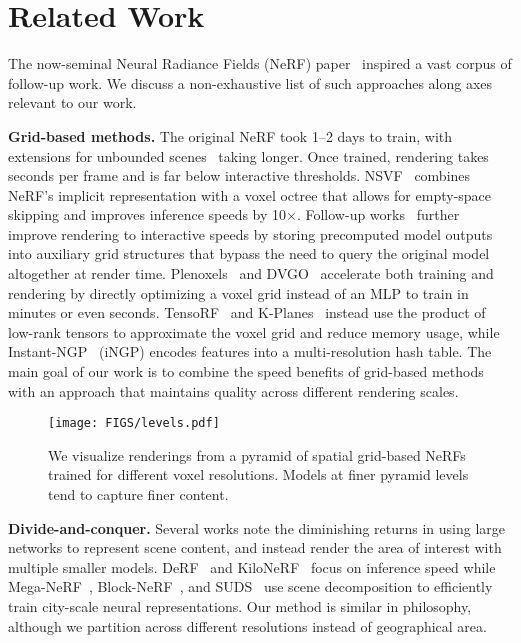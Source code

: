 \documentclass{article}
\begin{document}
\section{Related Work}

The now-seminal Neural Radiance Fields (NeRF) paper~\cite{mildenhall2020nerf} inspired a vast corpus of follow-up work. We discuss a non-exhaustive list of such approaches along axes relevant to our work.

\textbf{Grid-based methods.} The original NeRF took 1--2 days to train, with extensions for unbounded scenes~\cite{zhang2020npp, barron2022mipnerf360} taking longer. Once trained, rendering takes seconds per frame and is far below interactive thresholds. NSVF~\cite{liu2020neural} combines NeRF's implicit representation with a voxel octree that allows for empty-space skipping and improves inference speeds by 10×. Follow-up works~\cite{yu2021plenoctrees, garbin2021fastnerf, hedman2021snerg} further improve rendering to interactive speeds by storing precomputed model outputs into auxiliary grid structures that bypass the need to query the original model altogether at render time. Plenoxels~\cite{yu_and_fridovichkeil2021plenoxels} and DVGO~\cite{SunSC22} accelerate both training and rendering by directly optimizing a voxel grid instead of an MLP to train in minutes or even seconds. TensoRF~\cite{Chen2022ECCV} and K-Planes~\cite{kplanes_2023} instead use the product of low-rank tensors to approximate the voxel grid and reduce memory usage, while Instant-NGP~\cite{mueller2022instant} (iNGP) encodes features into a multi-resolution hash table. The main goal of our work is to combine the speed benefits of grid-based methods with an approach that maintains quality across different rendering scales.

\begin{figure*}[t!]
\texttt{[image: FIGS/levels.pdf]}
\caption{We visualize renderings from a pyramid of spatial grid-based NeRFs trained for different voxel resolutions. Models at finer pyramid levels tend to capture finer content.}
\label{fig:level-renderings}
\end{figure*}

\textbf{Divide-and-conquer.} Several works note the diminishing returns in using large networks to represent scene content, and instead render the area of interest with multiple smaller models. DeRF~\cite{derf} and KiloNeRF~\cite{reiser2021kilonerf} focus on inference speed while Mega-NeRF~\cite{Turki_2022_CVPR}, Block-NeRF~\cite{tancik2022blocknerf}, and SUDS~\cite{turki2023suds} use scene decomposition to efficiently train city-scale neural representations. Our method is similar in philosophy, although we partition across different resolutions instead of geographical area.
\end{document}
